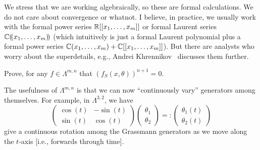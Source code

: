 \begin{remark}
We stress that we are working algebraically, so these are formal
calculations. We do not care about convergence or whatnot. I believe, in
practice, we usually work with the formal power series $\mathbb{R}[[x_{1},\dots,x_{m}]]$
or formal Laurent series $\mathbb{C}(\!(x_{1},\dots,x_{m})\!)$ (which intuitively
is just a formal Laurent polynomial plus a formal power series $\mathbb{C}(x_{1},\dots,x_{m}) + \mathbb{C}[[x_{1},\dots,x_{m}]]$).
But there are analysts who worry about the superdetails, e.g., Andrei
Khrennikov~\cite{Khrennikov:1999bd} discusses them further.
\end{remark}

\begin{exercise}
Prove, for any $f\in\Lambda^{m,n}$ that $(f_{S}(x,\theta))^{n+1}=0$.
\end{exercise}

\M
The usefulness of $\Lambda^{m,n}$ is that we can now ``continuously
vary'' generators among themselves. For example, in $\Lambda^{3,2}$, we
have
\begin{equation}
  \begin{pmatrix}
    \cos(t) & -\sin(t)\\
    \sin(t) &  \cos(t)
  \end{pmatrix}\begin{pmatrix}\theta_{1}\\\theta_{2}
  \end{pmatrix} =: \begin{pmatrix}\theta_{1}(t)\\\theta_{2}(t)
  \end{pmatrix}
\end{equation}
give a continuous rotation among the Grassmann generators as we move
along the $t$-axis [i.e., forwards through time].

